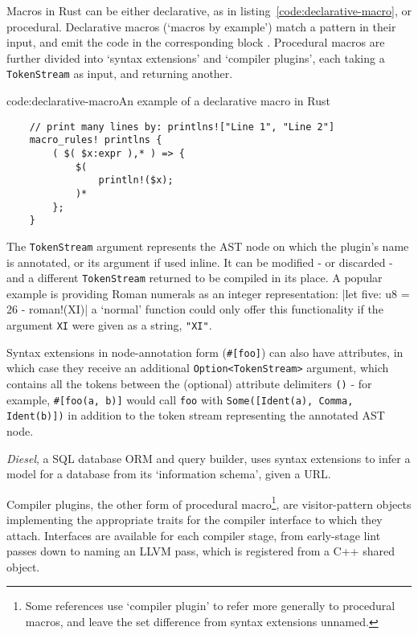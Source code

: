 Macros in Rust can be either declarative, as in listing~\ref{code:declarative-macro}, or procedural. Declarative macros (`macros by example') match a pattern in their input, and emit the code in the corresponding block \cite{rust_macros_overview}. Procedural macros are further divided into `syntax extensions' and `compiler plugins', each taking a \texttt{TokenStream} as input, and returning another. \cite{rust_macros_whereweat}

\begin{codelisting}{code:declarative-macro}{An example of a declarative macro in Rust}
\begin{verbatim}
	// print many lines by: printlns!["Line 1", "Line 2"]
	macro_rules! printlns {
		( $( $x:expr ),* ) => {
			$(
				println!($x);
			)*
		};
	}
\end{verbatim}	
\end{codelisting}

The \texttt{TokenStream} argument represents the AST node on which the plugin's name is annotated, or its argument if used inline. It can be modified - or discarded - and a different \texttt{TokenStream} returned to be compiled in its place. A popular example \cite{rust_macros_overview, rust_book} is providing Roman numerals as an integer representation: |let five: u8 = 26 - roman!(XI)| a `normal' function could only offer this functionality if the argument \texttt{XI} were given as a string, \texttt{"XI"}.

Syntax extensions in node-annotation form (\texttt{#[foo]}) can also have attributes, in which case they receive an additional \texttt{Option<TokenStream>} argument, which contains all the tokens between the (optional) attribute delimiters \texttt{()} - for example, \texttt{#[foo(a, b)]} would call \texttt{foo} with \texttt{Some([Ident(a), Comma, Ident(b)])} in addition to the token stream representing the annotated AST node. \cite{rust_rfc1566}

\emph{Diesel}, a SQL database ORM and query builder, uses syntax extensions to infer a model for a database from its `information schema', given a URL. \cite{rust_orm_diesel}

Compiler plugins, the other form of procedural macro\footnote{Some references \cite{rust_macros_overview} use `compiler plugin' to refer more generally to procedural macros, and leave the set difference from syntax extensions unnamed.}, are visitor-pattern objects implementing the appropriate traits for the compiler interface to which they attach. Interfaces are available for each compiler stage, from early-stage lint passes down to naming an LLVM pass, which is registered from a C++ shared object. \cite{rust_macro_registry, rust_tests_llvm_pass}


